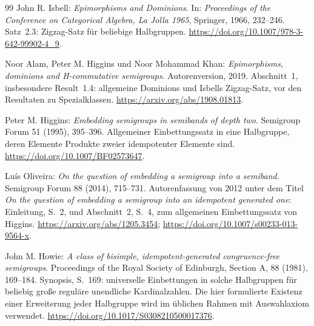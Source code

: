 \begin{thebibliography}{99}
John R. Isbell: \emph{Epimorphisms and Dominions}.
In: \emph{Proceedings of the Conference on Categorical Algebra,
La Jolla 1965}, Springer, 1966, 232--246.
Satz~2.3: Zigzag-Satz für beliebige Halbgruppen.
\url{https://doi.org/10.1007/978-3-642-99902-4_9}.

Noor Alam, Peter M. Higgins und Noor Mohammad Khan:
\emph{Epimorphisms, dominions and H-commutative semigroups}.
Autorenversion, 2019.
Abschnitt~1, insbesondere Result~1.4: allgemeine Dominions
und Isbells Zigzag-Satz, vor den Resultaten zu Spezialklassen.
\url{https://arxiv.org/abs/1908.01813}.

Peter M. Higgins: \emph{Embedding semigroups in semibands of depth two}.
Semigroup Forum 51 (1995), 395--396.
Allgemeiner Einbettungssatz in eine Halbgruppe, deren Elemente Produkte
zweier idempotenter Elemente sind.
\url{https://doi.org/10.1007/BF02573647}.

Luís Oliveira: \emph{On the question of embedding a semigroup into a semiband}.
Semigroup Forum 88 (2014), 715--731.
Autorenfassung von 2012 unter dem Titel
\emph{On the question of embedding a semigroup into an idempotent
generated one}: Einleitung, S.~2, und Abschnitt~2, S.~4,
zum allgemeinen Einbettungssatz von Higgins.
\url{https://arxiv.org/abs/1205.3454};
\url{https://doi.org/10.1007/s00233-013-9564-x}.

John M. Howie: \emph{A class of bisimple, idempotent-generated
congruence-free semigroups}.
Proceedings of the Royal Society of Edinburgh, Section A,
88 (1981), 169--184.
Synopsis, S.~169: universelle Einbettungen in solche Halbgruppen
für beliebig große reguläre unendliche Kardinalzahlen.
Die hier formulierte Existenz einer Erweiterung jeder Halbgruppe
wird im üblichen Rahmen mit Auswahlaxiom verwendet.
\url{https://doi.org/10.1017/S0308210500017376}.


\end{thebibliography}
